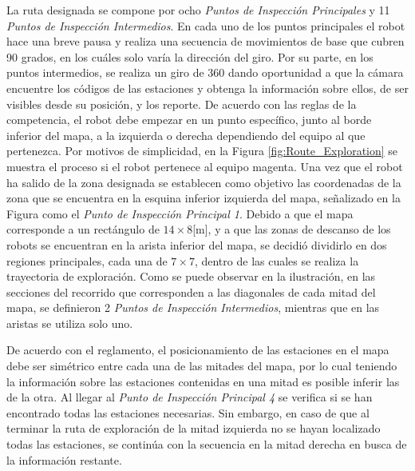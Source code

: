 La ruta designada se compone por ocho \textit{Puntos de Inspección Principales} y 11 \textit{Puntos de Inspección Intermedios}. En cada uno de los puntos principales el robot hace una breve pausa y realiza una secuencia de movimientos de base que cubren 90 grados, en los cuáles solo varía la dirección del giro. Por su parte, en los puntos intermedios, se realiza un giro de 360 dando oportunidad a que la cámara encuentre los códigos de las estaciones y obtenga la información sobre ellos, de ser visibles desde su posición, y los reporte. De acuerdo con las reglas de la competencia, el robot debe empezar en un punto específico, junto al borde inferior del mapa, a la izquierda o derecha dependiendo del equipo al que pertenezca. Por motivos de simplicidad, en la Figura \ref{fig:Route_Exploration} se muestra el proceso si el robot pertenece al equipo magenta.
Una vez que el robot ha salido de la zona designada se establecen como objetivo las coordenadas de la zona que se encuentra en la esquina inferior izquierda del mapa, señalizado en la Figura como el \textit{Punto de Inspección Principal 1}. 
Debido a que el mapa corresponde a un rectángulo de $14\times8$[m], y a que las zonas de descanso de los robots se encuentran en la arista inferior del mapa, se decidió dividirlo en dos regiones principales, cada una de $7\times7$, dentro de las cuales se realiza la trayectoria de exploración.  
Como se puede observar en la ilustración, en las secciones del recorrido que corresponden a las diagonales de cada mitad del mapa, se definieron 2 \textit{Puntos de Inspección Intermedios}, mientras que en las aristas se utiliza solo uno. 

De acuerdo con el reglamento, el posicionamiento de las estaciones en el mapa debe ser simétrico entre cada una de las mitades del mapa, por lo cual teniendo la información sobre las estaciones contenidas en una mitad es posible inferir las de la otra. Al llegar al \textit{Punto de Inspección Principal 4} se verifica si se han encontrado todas las estaciones necesarias. Sin embargo, en caso de que al terminar la ruta de exploración de la mitad izquierda no se hayan localizado todas las estaciones, se continúa con la secuencia en la mitad derecha en busca de la información restante. 

